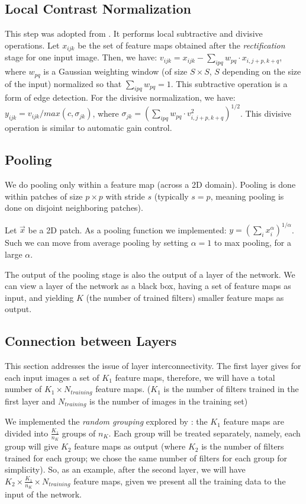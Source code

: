 \documentclass[runningheads]{llncs}
\begin{document}
\subsection{Local Contrast Normalization}
This step was adopted from \cite{jarrett-iccv-09}. It performs local subtractive and divisive operations.
Let $x_{ijk}$ be the set of feature maps obtained after the \textit{rectification} stage for one input image.
Then, we have: $v_{ijk}=x_{ijk}-\sum_{ipq}w_{pq}\cdot x_{i,j+p,k+q}$, where $w_{pq}$ is a Gaussian weighting window (of size $S\times S$, $S$ depending on the size of the input) normalized so that $\sum_{ipq}w_{pq}=1$. This subtractive operation is a form of edge detection.
For the divisive normalization, we have: $y_{ijk}=v_{ijk}/max(c,\sigma _{jk})$, where $\sigma _{jk}=(\sum_{ipq}w_{pq}\cdot v_{i,j+p,k+q}^2)^{1/2}$. This divisive operation is similar to automatic gain control.

\subsection{Pooling}
We do pooling only within a feature map (across a 2D domain). Pooling is done within patches of size $p\times p$ with stride $s$ (typically $s=p$, meaning pooling is done on disjoint neighboring patches).

Let $\vec{x}$ be a 2D patch. As a pooling function we implemented: $y=(\sum_i x_i^\alpha)^{1/\alpha}$. Such we can move from average pooling by setting $\alpha=1$ to max pooling, for a large $\alpha$. 


The output of the pooling stage is also the output of a layer of the network. We can view a layer of the network as a black box, having a set of feature maps as input, and yielding $K$ (the number of trained filters) smaller feature maps as output.

\subsection{Connection between Layers}
This section addresses the issue of layer interconnectivity. The first layer gives for each input images a set of $K_1$ feature maps, therefore, we will have a total number of $K_1 \times N_{training}$ feature maps. ($K_1$ is the number of filters trained in the first layer and $N_{training}$ is the number of images in the training set)

We implemented the \textit{random grouping} explored by \cite{DBLP:journals/corr/CulurcielloJDB13}: the $K_1$ feature maps are divided into $\frac{K_1}{n_K}$ groups of $n_K$. Each group will be treated separately, namely, each group will give $K_2$ feature maps as output (where $K_2$ is the number of filters trained for each group; we chose the same number of filters for each group for simplicity). So, as an example, after the second layer, we will have $K_2\times \frac{K_1}{n_K}\times N_{training}$ feature maps, given we present all the training data to the input of the network.
\end{document}
